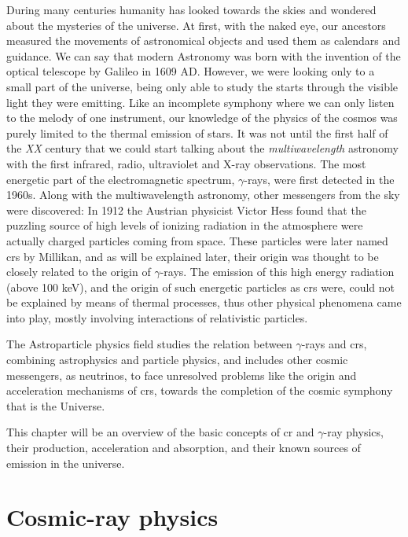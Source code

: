 \documentclass[main.tex]{subfiles}
\begin{document}
\glsresetall
During many centuries humanity has looked towards the skies and wondered about the mysteries of the universe. At first, with the naked eye, our ancestors measured the movements of astronomical objects and used them as calendars and guidance. We can say that modern Astronomy was born with the invention of the optical telescope by Galileo in 1609 AD. However, we were looking only to a small part of the universe, being only able to study the starts through the visible light they were emitting. Like an incomplete symphony where we can only listen to the melody of one instrument, our knowledge of the physics of the cosmos was purely limited to the thermal emission of stars. It was not until the first half of the \textit{XX} century that we could start talking about the \textit{multiwavelength} astronomy with the first infrared, radio, ultraviolet and X-ray observations. The most energetic part of the electromagnetic spectrum, $\gamma$-rays, were first detected in the 1960s.
Along with the multiwavelength astronomy, other messengers from the sky were discovered: In 1912 the Austrian physicist Victor Hess found that the puzzling source of high levels of ionizing radiation in the atmosphere were actually charged particles coming from space. These particles were later named \glspl{cr} by Millikan, and as will be explained later, their origin was thought to be closely related to the origin of $\gamma$-rays. The emission of this high energy radiation (above 100 keV), and the origin of such energetic particles as \glspl{cr} were, could not be explained by means of thermal processes, thus other physical phenomena came into play, mostly involving interactions of relativistic particles. 

The Astroparticle physics field studies the relation between $\gamma$-rays and \glspl{cr}, combining astrophysics and particle physics, and includes other cosmic messengers, as neutrinos, to face unresolved problems like the origin and acceleration mechanisms of \glspl{cr}, towards the completion of the cosmic symphony that is the Universe.

This chapter will be an overview of the basic concepts of \gls{cr} and $\gamma$-ray physics, their production, acceleration and absorption, and their known sources of emission in the universe.

\section{Cosmic-ray physics}
\end{document}
